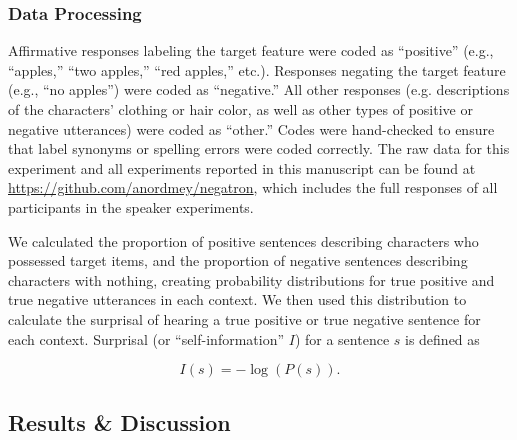 \documentclass[man, floatsintext, noapacite]{apa6}
\begin{document}
\subsubsection{Data Processing} 

Affirmative responses labeling the target feature were coded as ``positive'' (e.g., ``apples,'' ``two apples,'' ``red apples,'' etc.).  Responses negating the target feature (e.g., ``no apples'') were coded as ``negative.''  All other responses (e.g. descriptions of the characters' clothing or hair color, as well as other types of positive or negative utterances) were coded as ``other.''   Codes were hand-checked to ensure that label synonyms or spelling errors were coded correctly. The raw data for this experiment and all experiments reported in this manuscript can be found at \url{https://github.com/anordmey/negatron}, which includes the full responses of all participants in the speaker experiments. 

We calculated the proportion of positive sentences describing characters who possessed target items, and the proportion of negative sentences describing characters with nothing, creating probability distributions for true positive and true negative utterances in each context.  We then used this distribution to calculate the surprisal of hearing a true positive or true negative sentence for each context. Surprisal (or ``self-information'' $I$) for a sentence $s$ is defined as

\begin{equation}
\label{eq:surprise}
I(s) = -\log(P(s)).
\end{equation}

\subsection{Results \& Discussion}
\end{document}
